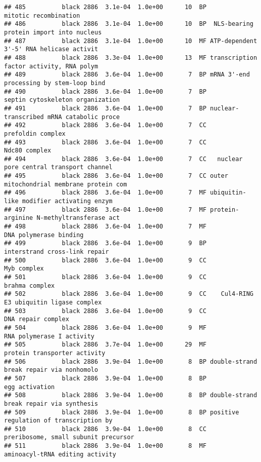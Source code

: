 \documentclass[]{article}
\begin{document}
\begin{verbatim}
## 485          black 2886  3.1e-04  1.0e+00      10  BP                    mitotic recombination
## 486          black 2886  3.1e-04  1.0e+00      10  BP  NLS-bearing protein import into nucleus
## 487          black 2886  3.1e-04  1.0e+00      10  MF ATP-dependent 3'-5' RNA helicase activit
## 488          black 2886  3.3e-04  1.0e+00      13  MF transcription factor activity, RNA polym
## 489          black 2886  3.6e-04  1.0e+00       7  BP mRNA 3'-end processing by stem-loop bind
## 490          black 2886  3.6e-04  1.0e+00       7  BP         septin cytoskeleton organization
## 491          black 2886  3.6e-04  1.0e+00       7  BP nuclear-transcribed mRNA catabolic proce
## 492          black 2886  3.6e-04  1.0e+00       7  CC                        prefoldin complex
## 493          black 2886  3.6e-04  1.0e+00       7  CC                            Ndc80 complex
## 494          black 2886  3.6e-04  1.0e+00       7  CC   nuclear pore central transport channel
## 495          black 2886  3.6e-04  1.0e+00       7  CC outer mitochondrial membrane protein com
## 496          black 2886  3.6e-04  1.0e+00       7  MF ubiquitin-like modifier activating enzym
## 497          black 2886  3.6e-04  1.0e+00       7  MF protein-arginine N-methyltransferase act
## 498          black 2886  3.6e-04  1.0e+00       7  MF                   DNA polymerase binding
## 499          black 2886  3.6e-04  1.0e+00       9  BP            interstrand cross-link repair
## 500          black 2886  3.6e-04  1.0e+00       9  CC                              Myb complex
## 501          black 2886  3.6e-04  1.0e+00       9  CC                           brahma complex
## 502          black 2886  3.6e-04  1.0e+00       9  CC    Cul4-RING E3 ubiquitin ligase complex
## 503          black 2886  3.6e-04  1.0e+00       9  CC                       DNA repair complex
## 504          black 2886  3.6e-04  1.0e+00       9  MF                RNA polymerase I activity
## 505          black 2886  3.7e-04  1.0e+00      29  MF             protein transporter activity
## 506          black 2886  3.9e-04  1.0e+00       8  BP double-strand break repair via nonhomolo
## 507          black 2886  3.9e-04  1.0e+00       8  BP                           egg activation
## 508          black 2886  3.9e-04  1.0e+00       8  BP double-strand break repair via synthesis
## 509          black 2886  3.9e-04  1.0e+00       8  BP positive regulation of transcription by 
## 510          black 2886  3.9e-04  1.0e+00       8  CC     preribosome, small subunit precursor
## 511          black 2886  3.9e-04  1.0e+00       8  MF          aminoacyl-tRNA editing activity

\end{verbatim}
\end{document}

